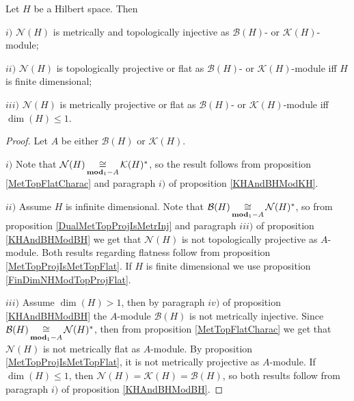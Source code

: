 \begin{proposition}\label{KHAndBHModNH} Let $H$ be a Hilbert space. Then

$i)$ $\mathcal{N}(H)$ is metrically and topologically injective as $\mathcal{B}(H)$- or $\mathcal{K}(H)$-module;

$ii)$ $\mathcal{N}(H)$ is topologically projective or flat as $\mathcal{B}(H)$- or $\mathcal{K}(H)$-module iff $H$ is finite dimensional;

$iii)$ $\mathcal{N}(H)$ is metrically projective or flat as $\mathcal{B}(H)$- or $\mathcal{K}(H)$-module iff $\dim(H)\leq 1$.
\end{proposition}
\begin{proof} Let $A$ be either $\mathcal{B}(H)$ or $\mathcal{K}(H)$.

$i)$ Note that $\mathcal{N}(H)\mathop{\mathbin{\cong}}\limits_{\mathbf{mod}_1-A}\mathcal{K}(H)^*$, so the result follows from proposition \ref{MetTopFlatCharac} and paragraph $i)$ of proposition \ref{KHAndBHModKH}.

$ii)$ Assume $H$ is infinite dimensional. Note that $\mathcal{B}(H)\mathop{\mathbin{\cong}}\limits_{\mathbf{mod}_1-A}\mathcal{N}(H)^*$, so from proposition \ref{DualMetTopProjIsMetrInj} and paragraph $iii)$ of proposition \ref{KHAndBHModBH} we get that $\mathcal{N}(H)$ is not topologically projective as $A$-module. Both results regarding flatness follow from proposition \ref{MetTopProjIsMetTopFlat}. If $H$ is finite dimensional we use proposition \ref{FinDimNHModTopProjFlat}.

$iii)$ Assume $\dim(H)>1$, then by paragraph $iv)$ of proposition \ref{KHAndBHModBH} the $A$-module $\mathcal{B}(H)$ is not metrically injective. Since $\mathcal{B}(H)\mathop{\mathbin{\cong}}\limits_{\mathbf{mod}_1-A}\mathcal{N}(H)^*$, then from proposition \ref{MetTopFlatCharac} we get that $\mathcal{N}(H)$ is not metrically flat as $A$-module. By proposition \ref{MetTopProjIsMetTopFlat}, it is not metrically projective as $A$-module. If $\dim(H)\leq 1$, then $\mathcal{N}(H)=\mathcal{K}(H)=\mathcal{B}(H)$, so both results follow from paragraph $i)$ of proposition \ref{KHAndBHModBH}.
\end{proof}

